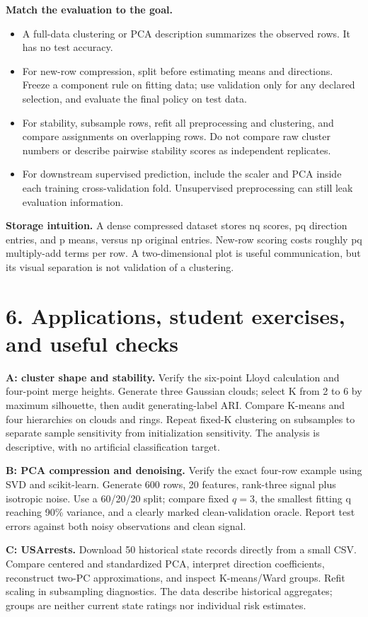 \documentclass[11pt,a4paper]{article}
\begin{document}
\textbf{Match the evaluation to the goal.}
\begin{itemize}
\item A full-data clustering or PCA description summarizes the observed rows. It has no test accuracy.
\item For new-row compression, split before estimating means and directions. Freeze a component rule on fitting data;
use validation only for any declared selection, and evaluate the final policy on test data.
\item For stability, subsample rows, refit all preprocessing and clustering, and compare assignments on overlapping rows.
Do not compare raw cluster numbers or describe pairwise stability scores as independent replicates.
\item For downstream supervised prediction, include the scaler and PCA inside each training cross-validation fold.
Unsupervised preprocessing can still leak evaluation information.
\end{itemize}
\textbf{Storage intuition.} A dense compressed dataset stores nq scores, pq direction entries, and p means,
versus np original entries. New-row scoring costs roughly pq multiply-add terms per row.
A two-dimensional plot is useful communication, but its visual separation is not validation of a clustering.

\newpage
\section*{6. Applications, student exercises, and useful checks}
\textbf{A: cluster shape and stability.} Verify the six-point Lloyd calculation and four-point merge heights.
Generate three Gaussian clouds; select K from 2 to 6 by maximum silhouette, then audit generating-label ARI.
Compare K-means and four hierarchies on clouds and rings. Repeat fixed-K clustering on subsamples to separate
sample sensitivity from initialization sensitivity. The analysis is descriptive, with no artificial classification target.

\textbf{B: PCA compression and denoising.} Verify the exact four-row example using SVD and scikit-learn.
Generate 600 rows, 20 features, rank-three signal plus isotropic noise.
Use a 60/20/20 split; compare fixed $q=3$, the smallest fitting q reaching 90\% variance, and a clearly marked
clean-validation oracle. Report test errors against both noisy observations and clean signal.

\textbf{C: USArrests.} Download 50 historical state records directly from a small CSV.
Compare centered and standardized PCA, interpret direction coefficients, reconstruct two-PC approximations,
and inspect K-means/Ward groups. Refit scaling in subsampling diagnostics.
The data describe historical aggregates; groups are neither current state ratings nor individual risk estimates.
\end{document}
